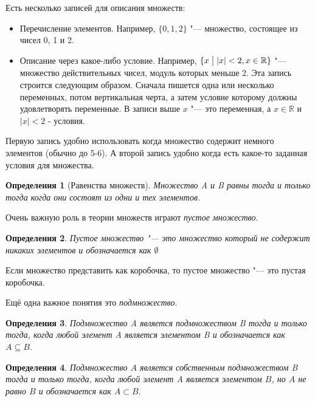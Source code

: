 \documentclass[a4paper, 16pt, oneside]{book}
\newtheorem{Definition}{Определения}[theorem]
\begin{document}
\par Есть несколько записей для описания множеств:
\begin{itemize}
    \item Перечисление элементов. Например, \(\{0, 1, 2\}\) "--- множество, состоящее из чисел 0, 1 и 2.
    \item Описание через какое-либо условие.
        Например, \(\{x \bigm| \left|x\right| < 2, x \in \mathbb{R}\}\) "--- множество действительных чисел, модуль которых меньше 2.
        Эта запись строится следующим образом. Сначала пишется одна или несколько переменных, потом вертикальная черта,
        а затем условие которому должны удовлетворять переменные.
        В записи выше \(x\) "--- это переменная, а \(x \in \mathbb{R}\) и \(\left| x \right| < 2\) - условия.
\end{itemize}

\par Первую запись удобно использовать когда множество содержит немного элементов (обычно до 5-6).
А второй запись удобно когда есть какое-то заданная условия для множества.

\begin{Definition}[Равенства множеств]
    \label{definiton:equal_sets}
    Множество A и B равны тогда и только тогда когда они состоят из одни и тех элементов.
\end{Definition}

\par Очень важную роль в теории множеств играют \textit{пустое множество}.
\begin{Definition}
    \label{definiton:emtyset}
    Пустое множество "--- это множество который не содержит никаких элементов и обозначается как \(\emptyset\)
\end{Definition}
\par Если множество представить как коробочка, то пустое множество "--- это пустая коробочка.

\par Ещё одна важное понятия это \textit{подмножество}.
\begin{Definition}
    \label{definiton:subset}
    Подмножество A является подмножеством B тогда и только тогда, когда любой элемент A является элементом B и обозначается как \(A \subseteq B\).
\end{Definition}

\begin{Definition}
    \label{definiton:strict_subset}
    Подмножество \(A\) является собственным подмножеством B тогда и только тогда,
    когда любой элемент A является элементом \(B\), но \(A\) не равно \(B\) и обозначается как \(A \subset B\).
\end{Definition}
\end{document}
